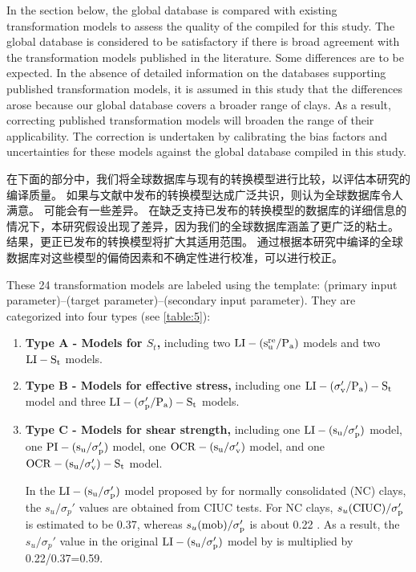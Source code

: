 \begin{paracol}{2}
    
    \switchcolumn*
        
    In the section below, the global database is compared with existing transformation models to assess the quality of the  compiled for this study. The global database is considered to be satisfactory if there is broad agreement with the transformation models published in the literature. Some differences are to be expected. In the absence of detailed information on the databases supporting published transformation models, it is assumed in this study that the differences arose because our global database covers a broader range of clays. As a result, correcting published transformation models will broaden the range of their applicability. The correction is undertaken by calibrating the bias factors and uncertainties for these models against the global database compiled in this study.
    
    \switchcolumn
        
    在下面的部分中，我们将全球数据库与现有的转换模型进行比较，以评估本研究的编译质量。 如果与文献中发布的转换模型达成广泛共识，则认为全球数据库令人满意。 可能会有一些差异。 在缺乏支持已发布的转换模型的数据库的详细信息的情况下，本研究假设出现了差异，因为我们的全球数据库涵盖了更广泛的粘土。 结果，更正已发布的转换模型将扩大其适用范围。 通过根据本研究中编译的全球数据库对这些模型的偏倚因素和不确定性进行校准，可以进行校正。
    
    \switchcolumn*
        
    These 24 transformation models are labeled using the template: (primary input parameter)–(target parameter)–(secondary input parameter). They are categorized into four types (see \autoref{table:5}):
    \begin{enumerate}
        \item \textbf{Type A - Models for $S_t$,} including two $\rm{LI}-(s_u^{re}/P_a)$ models and two $\rm{LI}-S_t$ models.
        
        \item \textbf{Type B - Models for effective stress,} including one $\rm{LI}-(\sigma_v'/P_a)-S_t$ model and three $\rm{LI}-(\sigma_p'/P_a)-S_t$ models.
        
        \item \textbf{Type C - Models for shear strength,} including one $\rm{LI}-(s_u/\sigma_p')$ model, one $\rm{PI}-(s_u/\sigma_p')$ model, one $\rm{OCR}-(s_u/\sigma_v')$ model, and one $\rm{OCR}-(s_u/\sigma_v')-S_t$ model. 

        In the $\rm{LI}-(s_u/\sigma_p')$ model proposed by \citet{Bjerrum1960711} for normally consolidated (NC) clays, the $s_u/\sigma_p'$ values are obtained from CIUC tests. For NC clays, $s_u(\rm{CIUC})/\sigma_p'$ is estimated to be 0.37, whereas $s_u(\rm{mob})/\sigma_p'$ is about 0.22 \citep{Mesri1975409}. As a result, the $s_u/\sigma_p'$ value in the original $\rm{LI}-(s_u/\sigma_p')$ model by \citet{Bjerrum1960711} is multiplied by 0.22/0.37=0.59.


\end{enumerate}
\end{paracol}
